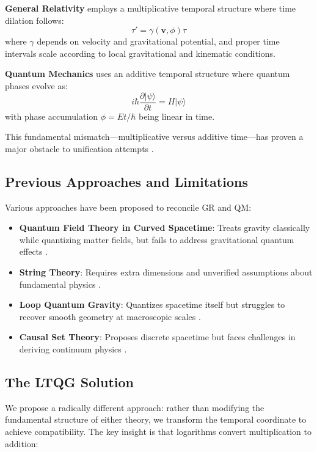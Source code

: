 \documentclass[12pt,a4paper]{article}
\begin{document}
\textbf{General Relativity} employs a multiplicative temporal structure where time dilation follows:
\begin{equation}
\tau' = \gamma(\mathbf{v}, \phi) \tau
\label{eq:gr_time}
\end{equation}
where $\gamma$ depends on velocity and gravitational potential, and proper time intervals scale according to local gravitational and kinematic conditions.

\textbf{Quantum Mechanics} uses an additive temporal structure where quantum phases evolve as:
\begin{equation}
i\hbar \frac{\partial |\psi\rangle}{\partial t} = H |\psi\rangle
\label{eq:qm_evolution}
\end{equation}
with phase accumulation $\phi = Et/\hbar$ being linear in time.

This fundamental mismatch—multiplicative versus additive time—has proven a major obstacle to unification attempts \cite{Wheeler1989, Penrose2004, Ashtekar2011}.

\subsection{Previous Approaches and Limitations}

Various approaches have been proposed to reconcile GR and QM:

\begin{itemize}
\item \textbf{Quantum Field Theory in Curved Spacetime}: Treats gravity classically while quantizing matter fields, but fails to address gravitational quantum effects \cite{Birrell1982}.
\item \textbf{String Theory}: Requires extra dimensions and unverified assumptions about fundamental physics \cite{Green1987}.
\item \textbf{Loop Quantum Gravity}: Quantizes spacetime itself but struggles to recover smooth geometry at macroscopic scales \cite{Rovelli2004}.
\item \textbf{Causal Set Theory}: Proposes discrete spacetime but faces challenges in deriving continuum physics \cite{Bombelli1987}.
\end{itemize}

\subsection{The LTQG Solution}

We propose a radically different approach: rather than modifying the fundamental structure of either theory, we transform the temporal coordinate to achieve compatibility. The key insight is that logarithms convert multiplication to addition:
\end{document}
